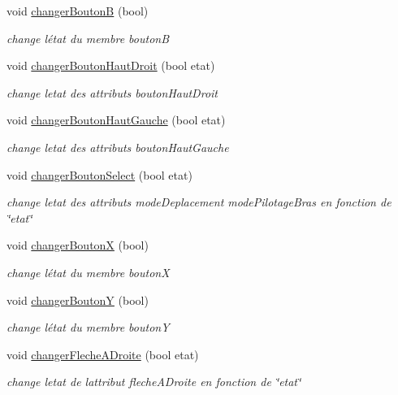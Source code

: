 \begin{DoxyCompactItemize}
void \hyperlink{class_manette_af38f60c4bfa3f76da9c4598b0b144fd6}{changer\+BoutonB} (bool)
\begin{DoxyCompactList}\small\item\em change l\textquotesingle{}état du membre boutonB \end{DoxyCompactList}\item 
void \hyperlink{class_manette_a039b73883b0649e1bbaa7f7b3dff43f8}{changer\+Bouton\+Haut\+Droit} (bool etat)
\begin{DoxyCompactList}\small\item\em change l\textquotesingle{}etat des attributs bouton\+Haut\+Droit \end{DoxyCompactList}\item 
void \hyperlink{class_manette_a739830941c396dabb7c57862a1880a34}{changer\+Bouton\+Haut\+Gauche} (bool etat)
\begin{DoxyCompactList}\small\item\em change l\textquotesingle{}etat des attributs bouton\+Haut\+Gauche \end{DoxyCompactList}\item 
void \hyperlink{class_manette_a37710e94b9d871a577740daf13cb571b}{changer\+Bouton\+Select} (bool etat)
\begin{DoxyCompactList}\small\item\em change l\textquotesingle{}etat des attributs mode\+Deplacement mode\+Pilotage\+Bras en fonction de \char`\"{}etat\char`\"{} \end{DoxyCompactList}\item 
void \hyperlink{class_manette_a5d9f34f3ec334fa3880d93175f0df152}{changer\+BoutonX} (bool)
\begin{DoxyCompactList}\small\item\em change l\textquotesingle{}état du membre boutonX \end{DoxyCompactList}\item 
void \hyperlink{class_manette_a070a7551299aad2db041591004d2bc60}{changer\+BoutonY} (bool)
\begin{DoxyCompactList}\small\item\em change l\textquotesingle{}état du membre boutonY \end{DoxyCompactList}\item 
void \hyperlink{class_manette_abb0ab6adafd0785d1fef58481005ac41}{changer\+Fleche\+A\+Droite} (bool etat)
\begin{DoxyCompactList}\small\item\em change l\textquotesingle{}etat de l\textquotesingle{}attribut fleche\+A\+Droite en fonction de \char`\"{}etat\char`\"{} \end{DoxyCompactList}\item 

\end{DoxyCompactItemize}
